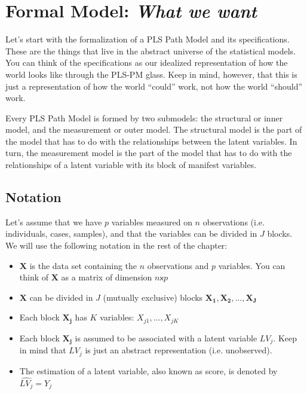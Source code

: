 \documentclass[12pt]{book}\usepackage{graphicx, color}
\begin{document}
\section{Formal Model: \textit{What we want}}
Let's start with the formalization of a PLS Path Model and its specifications. These are the things that live in the abstract universe of the statistical models. You can think of the specifications as our idealized representation of how the world looks like through the PLS-PM glass. Keep in mind, however, that this is just a representation of how the world ``could'' work, not how the world ``should'' work.

Every PLS Path Model is formed by two submodels: the structural or inner model, and the measurement or outer model. The structural model is the part of the model that has to do with the relationships between the latent variables. In turn, the measurement model is the part of the model that has to do with the relationships of a latent variable with its block of manifest variables.

\subsection*{Notation}
Let's assume that we have $p$ variables measured on $n$ observations (i.e. individuals, cases, samples), and that the variables can be divided in $J$ blocks. We will use the following notation in the rest of the chapter:
\begin{itemize}
 \item[] $\mathbf{X}$ is the data set containing the $n$ observations and $p$ variables. You can think of $\mathbf{X}$ as a matrix of dimension $n \mathsf{x} p$
 
 \item[] $\mathbf{X}$ can be divided in $J$ (mutually exclusive) blocks $\mathbf{X_1}, \mathbf{X_2}, \dots, \mathbf{X_J}$

 \item[] Each block $\mathbf{X_j}$ has $K$ variables: $X_{j1}, \dots, X_{jK}$
 
 \item[] Each block $\mathbf{X_j}$ is assumed to be associated with a latent variable $LV_j$. Keep in mind that $LV_j$ is just an abstract representation (i.e. unobserved).
 
 \item[] The estimation of a latent variable, also known as score, is denoted by $\widehat{LV_j} = Y_j$
\end{itemize}
\end{document}
